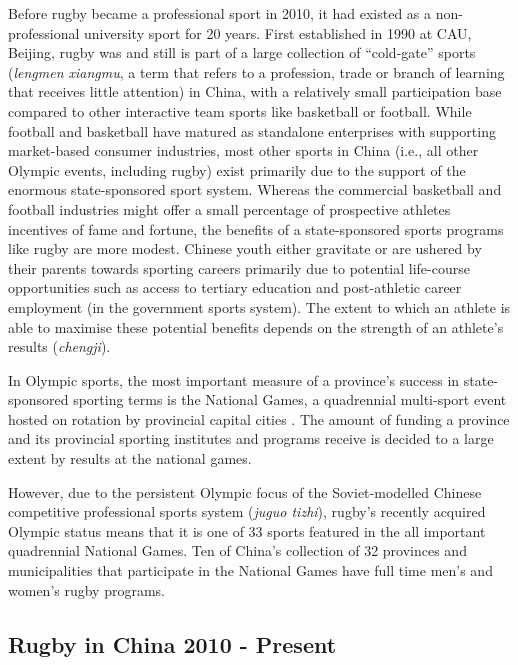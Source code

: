 Before rugby became a professional sport in 2010, it had existed as a non-professional university sport for 20 years.  First established in 1990 at CAU, Beijing, rugby was and still is part of a large collection of ``cold-gate'' sports (\textit{lengmen xiangmu}, a term that refers to a profession, trade or branch of learning that receives little attention) in China, with a relatively small participation base compared to other interactive team sports like basketball or football.  While football and basketball have matured as standalone enterprises with supporting market-based consumer industries, most other sports in China (i.e., all other Olympic events, including rugby) exist primarily due to the support of the enormous state-sponsored sport system.  Whereas the commercial basketball and football industries might offer a small percentage of prospective athletes incentives of fame and fortune, the benefits of a state-sponsored sports programs like rugby are more modest.  Chinese youth either gravitate or are ushered by their parents towards sporting careers primarily due to potential life-course opportunities such as access to tertiary education and post-athletic career employment (in the government sports system).  The extent to which an athlete is able to maximise these potential benefits depends on the strength of an athlete's results (\textit{chengji}).

In Olympic sports, the most important measure of a province's success in state-sponsored sporting terms is the National Games, a quadrennial multi-sport event hosted on rotation by provincial capital cities \citep{Hong2002}.  The amount of funding a province and its provincial sporting institutes and programs receive is decided to a large extent by results at the national games.

However, due to the persistent Olympic focus of the Soviet-modelled Chinese competitive professional sports system (\textit{juguo tizhi}), rugby's recently acquired Olympic status means that it is one of 33 sports featured in the all important quadrennial National Games.  Ten of China's collection of 32 provinces and municipalities that participate in the National Games have full time men's and women's rugby programs.


\subsection{Rugby in China 2010 - Present}

